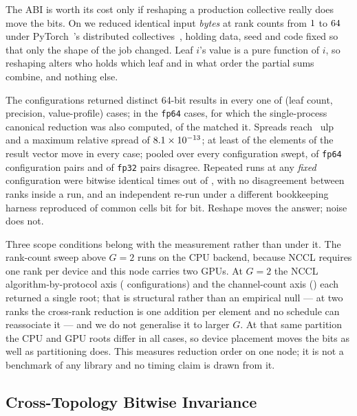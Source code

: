 \documentclass[journal,10pt]{IEEEtran}
\theoremstyle{plain}
\theoremstyle{definition}
\theoremstyle{remark}
\newcommand{\sv}[1]{\texttt{#1}}
\begin{document}
The ABI is worth its cost only if reshaping a production collective really
does move the bits. On \GpuHardware{} we reduced identical input \emph{bytes}
at \GpuWorldSizes{} rank counts from $1$ to $64$ under
PyTorch~\GpuStack{}'s distributed collectives~\cite{li2020pytorch}, holding
data, seed and code fixed so that only the shape of the job changed. Leaf $i$'s
value is a pure function of $i$, so reshaping alters who holds which leaf and
in what order the partial sums combine, and nothing else.

The \GpuWorldSizes{} configurations returned \GpuRootsDistinct{} distinct
64-bit results in every one of \GpuCases{} (leaf count, precision,
value-profile) cases; in the \GpuCanonCases{} \sv{fp64} cases, for which the
single-process canonical reduction was also computed, \GpuEqCanonical{} of the
\GpuWorldSizes{} matched it. Spreads reach \GpuUlpMax{}~ulp and a maximum
relative spread of $8.1\times10^{-13}$; at least \GpuElemsMovedMin{} of the
\GpuElemsTotal{} elements of the result vector move in every case; pooled over
every configuration swept, \GpuPairDblPct{} of \sv{fp64} configuration pairs
and \GpuPairSglPct{} of \sv{fp32} pairs disagree. Repeated runs at any
\emph{fixed} configuration were bitwise identical \GpuRepeats{} times out of
\GpuRepeats{}, with no disagreement between ranks inside a run, and an
independent re-run under a different bookkeeping harness reproduced
\GpuXCheck{} of \GpuXCheck{} common cells bit for bit. Reshape moves the
answer; noise does not.

Three scope conditions belong with the measurement rather than under it. The
rank-count sweep above $G{=}2$ runs on the CPU backend, because NCCL requires
one rank per device and this node carries two GPUs. At $G{=}2$ the NCCL
algorithm-by-protocol axis (\GpuLibCfgs{} configurations) and the
channel-count axis (\GpuChanCfgs{}) each returned a single root; that is
structural rather than an empirical null --- at two ranks the cross-rank
reduction is one addition per element and no schedule can reassociate it ---
and we do not generalise it to larger $G$. At that same partition the CPU and
GPU roots differ in all \GpuCases{} cases, so device placement moves the bits
as well as partitioning does. This measures reduction order on one node; it is
not a benchmark of any library and no timing claim is drawn from it.

\subsection{Cross-Topology Bitwise Invariance}\label{sec:results-invariance}
\end{document}

